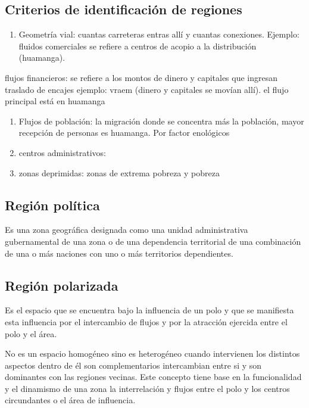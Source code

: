 \documentclass[
  a4paper,
]{article}
\providecommand{\tightlist}{%
  \setlength{\itemsep}{0pt}\setlength{\parskip}{0pt}}\usepackage{longtable,booktabs,array}
\begin{document}
\subsection{Criterios de identificación de
regiones}\label{criterios-de-identificaciuxf3n-de-regiones}

\begin{enumerate}
\def\labelenumi{\arabic{enumi}.}
\tightlist
\item
  Geometría vial: cuantas carreteras entras allí y cuantas conexiones.
  Ejemplo: fluidos comerciales se refiere a centros de acopio a la
  distribución (huamanga).
\end{enumerate}

flujos financieros: se refiere a los montos de dinero y capitales que
ingresan traslado de encajes ejemplo: vraem (dinero y capitales se
movían allí). el flujo principal está en huamanga

\begin{enumerate}
\def\labelenumi{\arabic{enumi}.}
\setcounter{enumi}{1}
\tightlist
\item
  Flujos de población: la migración donde se concentra más la población,
  mayor recepción de personas es huamanga. Por factor enológicos
\item
  centros administrativos:
\item
  zonas deprimidas: zonas de extrema pobreza y pobreza
\end{enumerate}

\subsection{Región política}\label{regiuxf3n-poluxedtica}

Es una zona geográfica designada como una unidad administrativa
gubernamental de una zona o de una dependencia territorial de una
combinación de una o más naciones con uno o más territorios
dependientes.

\subsection{Región polarizada}\label{regiuxf3n-polarizada}

Es el espacio que se encuentra bajo la influencia de un polo y que se
manifiesta esta influencia por el intercambio de flujos y por la
atracción ejercida entre el polo y el área.

No es un espacio homogéneo sino es heterogéneo cuando intervienen los
distintos aspectos dentro de él son complementarios intercambian entre
si y son dominantes con las regiones vecinas. Este concepto tiene base
en la funcionalidad y el dinamismo de una zona la interrelación y flujos
entre el polo y los centros circundantes o el área de influencia.
\end{document}
